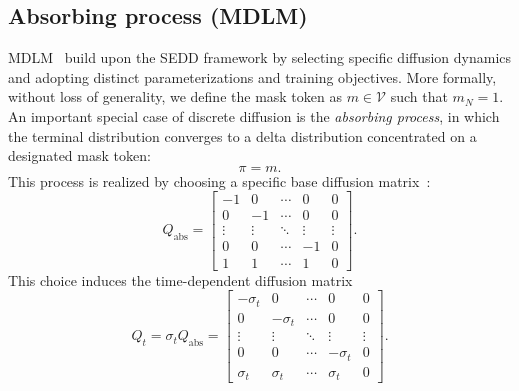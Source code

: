     \subsection{Absorbing process (MDLM)}
        \label{app:absorbing process}
        MDLM~\citep{sahoo2024simple} build upon the SEDD framework by selecting specific diffusion dynamics and adopting distinct parameterizations and training objectives.
        More formally, without loss of generality, we define the mask token as $m \in \mathcal{V}$ such that $m_N = 1$. An important special case of discrete diffusion is the \textit{absorbing process}, in which the terminal distribution converges to a delta distribution concentrated on a designated mask token: $$\pi = m.$$ This process is realized by choosing a specific base diffusion matrix~\citep{lou2024discrete}:
        \begin{equation}
            Q_{\text{abs}} =
            \begin{bmatrix}
                -1 & 0 & \cdots & 0 & 0 \\
                0 & -1 & \cdots & 0 & 0 \\
                \vdots & \vdots & \ddots & \vdots & \vdots \\
                0 & 0 & \cdots & -1 & 0 \\
                1 & 1 & \cdots & 1 & 0
            \end{bmatrix}.
        \end{equation}
        This choice induces the time-dependent diffusion matrix
        \begin{equation}
            \label{eq: absorbing diffusion matrix}
            Q_t = \sigma_t Q_{\text{abs}} =
            \begin{bmatrix}
                -\sigma_t & 0 & \cdots & 0 & 0 \\
                0 & -\sigma_t & \cdots & 0 & 0 \\
                \vdots & \vdots & \ddots & \vdots & \vdots \\
                0 & 0 & \cdots & -\sigma_t & 0 \\
                \sigma_t & \sigma_t & \cdots & \sigma_t & 0
            \end{bmatrix}.
        \end{equation}
        
